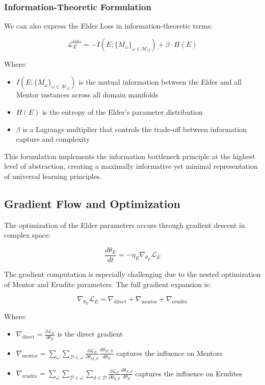 \subsubsection{Information-Theoretic Formulation}

We can also express the Elder Loss in information-theoretic terms:

\begin{equation}
\mathcal{L}_E^{\text{info}} = -I(E; \{M_{\omega}\}_{\omega \in \mathcal{M}_{\Omega}}) + \beta \cdot H(E)
\end{equation}

Where:
\begin{itemize}
\item $I(E; \{M_{\omega}\}_{\omega \in \mathcal{M}_{\Omega}})$ is the mutual information between the Elder and all Mentor instances across all domain manifolds
\item $H(E)$ is the entropy of the Elder's parameter distribution
\item $\beta$ is a Lagrange multiplier that controls the trade-off between information capture and complexity
\end{itemize}

This formulation implements the information bottleneck principle at the highest level of abstraction, creating a maximally informative yet minimal representation of universal learning principles.

\subsection{Gradient Flow and Optimization}

The optimization of the Elder parameters occurs through gradient descent in complex space:

\begin{equation}
\frac{d\theta_E}{dt} = -\eta_E \nabla_{\theta_E} \mathcal{L}_E
\end{equation}

The gradient computation is especially challenging due to the nested optimization of Mentor and Erudite parameters. The full gradient expansion is:

\begin{equation}
\nabla_{\theta_E} \mathcal{L}_E = \nabla_{\text{direct}} + \nabla_{\text{mentor}} + \nabla_{\text{erudite}}
\end{equation}

Where:
\begin{itemize}
\item $\nabla_{\text{direct}} = \frac{\partial \mathcal{L}_E}{\partial \theta_E}$ is the direct gradient
\item $\nabla_{\text{mentor}} = \sum_{\omega} \sum_{\mathcal{D} \in \omega} \frac{\partial \mathcal{L}_E}{\partial \theta_{M,\mathcal{D}}} \frac{d\theta_{M,\mathcal{D}}}{d\theta_E}$ captures the influence on Mentors
\item $\nabla_{\text{erudite}} = \sum_{\omega} \sum_{\mathcal{D} \in \omega} \sum_{d \in \mathcal{D}} \frac{\partial \mathcal{L}_E}{\partial \theta_{E,d}} \frac{d\theta_{E,d}}{d\theta_E}$ captures the influence on Erudites
\end{itemize}

